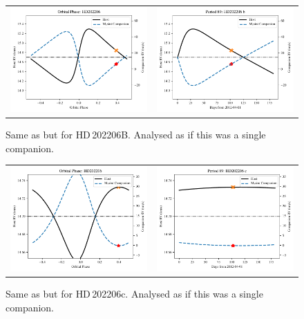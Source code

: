 \begin{figure}
    \centering
    \begin{tabular}{cc}
        \includegraphics[width=0.45\linewidth]{figures/direct-recovery/orbital-plots/HD202206B_orbital_phase.pdf}&
        \includegraphics[width=0.45\linewidth]{figures/direct-recovery/orbital-plots/HD202206B_p89.pdf}\\
    \end{tabular}
    \caption{Same as  but for {HD\,202206}B. Analysed as if this was a single companion.}
    \label{fig:hd202206bp89}
\end{figure}

\begin{figure}
    \centering
    \begin{tabular}{cc}
        \includegraphics[width=0.45\linewidth]{figures/direct-recovery/orbital-plots/HD202206c_orbital_phase.pdf}&
        \includegraphics[width=0.45\linewidth]{figures/direct-recovery/orbital-plots/HD202206c_p89.pdf}\\
    \end{tabular}
    \caption{Same as  but for {HD\,202206}c. Analysed as if this was a single companion. }
    \label{fig:hd202206cp89}
\end{figure}

